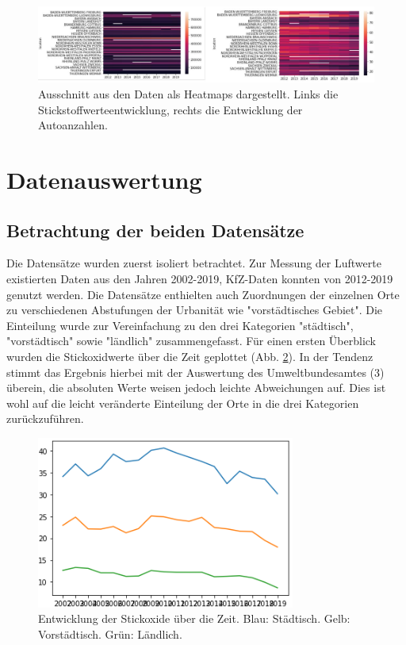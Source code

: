 \documentclass[11pt,a4paper,oneside,german]{article}
\begin{document}
	\begin{figure}[h!]
		\centering
		\includegraphics[width=12cm]{Heatmaps.png}
		\caption{Ausschnitt aus den Daten als Heatmaps dargestellt. Links die Stickstoffwerteentwicklung, rechts die Entwicklung der Autoanzahlen.}
		\label{fig:Heatmaps}
	\end{figure}
	
	\section{Datenauswertung}
	
	\subsection{Betrachtung der beiden Datensätze}
	
	Die Datensätze wurden zuerst isoliert betrachtet. Zur Messung der Luftwerte existierten Daten aus den Jahren 2002-2019, KfZ-Daten konnten von 2012-2019 genutzt werden. Die  Datensätze enthielten auch Zuordnungen der einzelnen Orte zu verschiedenen Abstufungen der Urbanität wie "vorstädtisches Gebiet". Die Einteilung wurde zur Vereinfachung zu den drei Kategorien "städtisch", "vorstädtisch" sowie "ländlich" zusammengefasst. Für einen ersten Überblick wurden die Stickoxidwerte über die Zeit geplottet (Abb. \ref{fig:NO2Entwicklung}). In der Tendenz stimmt das Ergebnis hierbei mit der Auswertung des Umweltbundesamtes (3) überein, die absoluten Werte weisen jedoch leichte Abweichungen auf. Dies ist wohl auf die leicht veränderte Einteilung der Orte in die drei Kategorien zurückzuführen.\\
	
	\begin{figure}[h!]
		\centering
		\includegraphics[width=8.5cm]{NO2Entwicklung.png}
		\caption{Entwicklung der Stickoxide über die Zeit. Blau: Städtisch. Gelb: Vorstädtisch. Grün: Ländlich.}
		\label{fig:NO2Entwicklung}
	\end{figure}
	
\end{document}
